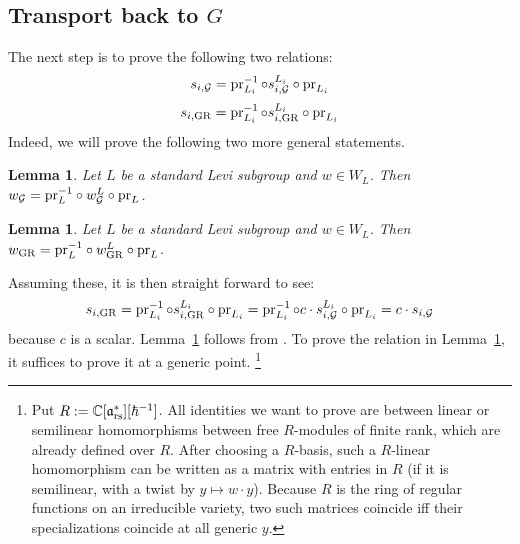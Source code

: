 \documentclass{article}
\theoremstyle{plain}
\newtheorem{lemma}[theorem]{Lemma}
\theoremstyle{definition}
\theoremstyle{remark}
\numberwithin{equation}{section}
\begin{document}
\subsection*{Transport back to $G$}
The next step is to prove the following two relations:
\begin{equation*}
    s_{i,\mathcal G} = \operatorname{pr}_{L_i}^{-1}\circ s_{i,\mathcal G}^{L_i}\circ \operatorname{pr}_{L_i}
\end{equation*}
\begin{equation*}
     s_{i,\mathrm{GR}} = \operatorname{pr}_{L_i}^{-1}\circ s_{i,\mathrm{GR}}^{L_i}\circ \operatorname{pr}_{L_i}
\end{equation*}
Indeed, we will prove the following two more general statements.

\begin{lemma}\label{lem:WD}
Let $L$ be a standard Levi subgroup and $w\in W_L$. Then $w_{\mathcal G}=\mathrm{pr}_L^{-1}\circ w^L_{\mathcal G}\circ\mathrm{pr}_L$.
\end{lemma}

\begin{lemma}\label{lem:WP}
Let $L$ be a standard Levi subgroup and $w\in W_L$. Then $w_{\mathrm{GR}}=\mathrm{pr}_L^{-1}\circ w^L_{\mathrm{GR}}\circ\mathrm{pr}_L$.
\end{lemma}

Assuming these, it is then straight forward to see:
\begin{equation*}
    s_{i,\mathrm{GR}} = \operatorname{pr}_{L_i}^{-1}\circ s_{i,\mathrm{GR}}^{L_i}\circ \operatorname{pr}_{L_i} = \operatorname{pr}_{L_i}^{-1}\circ c\cdot s_{i,\mathcal G}^{L_i}\circ \operatorname{pr}_{L_i} = c \cdot s_{i,\mathcal G}
\end{equation*}
because $c$ is a scalar. Lemma~\ref{lem:WP} follows from \cite[Lemma 4.6.5]{ginzburg2014differentialoperatorsguaffine}.
To prove the relation in Lemma~\ref{lem:WD}, it suffices to prove it at a generic point. \footnote{ Put $R:=\mathbb{C}[\mathfrak{a}^*_{\mathrm{rs}}][\hbar^{-1}]$. All identities we want to prove are between linear or semilinear homomorphisms between free $R$-modules of finite rank, which are already defined over $R$. After choosing a $R$-basis, such a $R$-linear homomorphism can be written as a matrix with entries in $R$ (if it is semilinear, with a  twist by $y\mapsto w\cdot y$). Because $R$ is the ring of regular functions on an irreducible variety, two such matrices coincide iff their specializations coincide at all generic $y$.}
\end{document}
